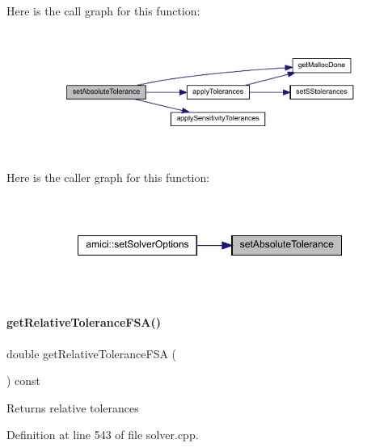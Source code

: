 Here is the call graph for this function\+:
\nopagebreak
\begin{figure}[H]
\begin{center}
\leavevmode
\includegraphics[width=350pt]{classamici_1_1_solver_afe0fd2fad6ce110ad8421f5979945f90_cgraph}
\end{center}
\end{figure}
Here is the caller graph for this function\+:
\nopagebreak
\begin{figure}[H]
\begin{center}
\leavevmode
\includegraphics[width=349pt]{classamici_1_1_solver_afe0fd2fad6ce110ad8421f5979945f90_icgraph}
\end{center}
\end{figure}
\mbox{\label{classamici_1_1_solver_acf203e64c34e2d20a6fd563029c19b57}} 
\paragraph{\texorpdfstring{getRelativeToleranceFSA()}{getRelativeToleranceFSA()}}
{\footnotesize\ttfamily double get\+Relative\+Tolerance\+F\+SA (\begin{DoxyParamCaption}{ }\end{DoxyParamCaption}) const}

\begin{DoxyReturn}{Returns}
relative tolerances 
\end{DoxyReturn}


Definition at line 543 of file solver.\+cpp.

